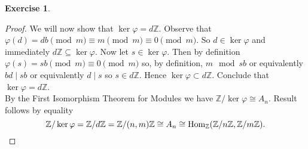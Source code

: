 \documentclass[8pt]{amsart}
\theoremstyle{plain}%
\theoremstyle{definition}
\newtheorem*{exercise}{Exercise}%
\theoremstyle{remark}
\numberwithin{equation}{section}
\newcommand{\Z}{\mathbb{Z}}
\begin{document}
\begin{exercise}
\begin{proof}
		We will now show that $\ker \varphi = d\Z$. Observe that $\varphi(d) = db \pmod m \equiv m \pmod m \equiv 0 \pmod m$. So $d \in \ker \varphi$ and immediately $d\Z \subseteq \ker \varphi$. Now let $s \in \ker \varphi$. Then by definition $\varphi(s) = sb \pmod m \equiv 0 \pmod m$ so, by definition, $m \mod sb$ or equivalently $bd \mid sb$ or equivalently $d \mid s$ so $s \in d\Z$. Hence $\ker\varphi \subset d\Z$. Conclude that $\ker\varphi = d\Z$.\\

		By the First Isomorphism Theorem for Modules we have $\Z/\ker\varphi \cong A_n$. Result follows by equality  $$\Z/\ker \varphi = \Z/d\Z = \Z/(n, m)\Z \cong A_n \cong \operatorname{Hom}_\Z(\Z/n\Z, \Z/m\Z).\qedhere$$

	\end{proof}
\end{exercise}
\end{document}

